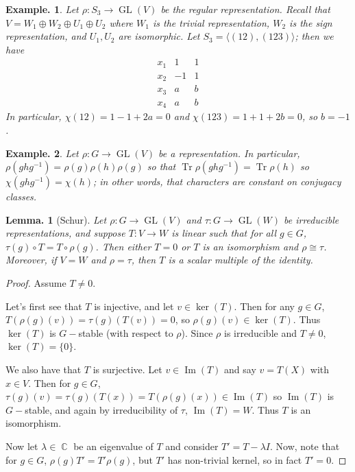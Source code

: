\documentclass[11pt, a4paper]{memoir}
\DeclareMathOperator{\C}{{\mathbb{C}}}
\theoremstyle{change}
\newtheorem{lemma}[theorem]{Lemma.}
\theoremstyle{plain}
\theoremstyle{nonumberplain}
\newtheorem{example}{Example.}
\newtheorem{proof}{Proof}
\DeclareMathOperator{\GL}{GL}
\renewcommand{\Im}{\ensuremath{\operatorname{Im}}}
\DeclareMathOperator{\Tr}{Tr}
\numberwithin{equation}{section}
\begin{document}
\begin{example}
    Let $\rho:S_3\to\GL(V)$ be the regular representation.
    Recall that $V=W_1\oplus W_2\oplus U_1\oplus U_2$ where $W_1$ is the trivial representation, $W_2$ is the sign representation, and $U_1,U_2$ are isomorphic.
    Let $S_3=\langle (12),(123)\rangle$; then we have
    \begin{equation*}
        \begin{array}{c|cc}
            x_1 & 1 & 1\\
            \hline
            x_2 & -1 & 1\\
            x_3 & a & b\\
            x_4 & a & b
        \end{array}
    \end{equation*}
    In particular, $\chi(12)=1-1+2a=0$ and $\chi(123)=1+1+2b=0$, so $b=-1$.
\end{example}
\begin{example}
    Let $\rho:G\to\GL(V)$ be a representation.
    In particular, $\rho(ghg^{-1})=\rho(g)\rho(h)\rho(g)$ so that $\Tr\rho(ghg^{-1})=\Tr\rho(h)$ so $\chi(ghg^{-1})=\chi(h)$; in other words, that characters are constant on conjugacy classes.
\end{example}
\begin{lemma}[Schur]
    Let $\rho:G\to\GL(V)$ and $\tau:G\to\GL(W)$ be irreducible representations, and suppose $T:V\to W$ is linear such that for all $g\in G$, $\tau(g)\circ T=T\circ\rho(g)$.
    Then either $T=0$ or $T$ is an isomorphism and $\rho\cong\tau$.
    Moreover, if $V=W$ and $\rho=\tau$, then $T$ is a scalar multiple of the identity.
\end{lemma}
\begin{proof}
    Assume $T\neq 0$.

    Let's first see that $T$ is injective, and let $v\in\ker(T)$.
    Then for any $g\in G$, $T(\rho(g)(v))=\tau(g)(T(v))=0$, so $\rho(g)(v)\in\ker(T)$.
    Thus $\ker(T)$ is $G-$stable (with respect to $\rho$).
    Since $\rho$ is irreducible and $T\neq 0$, $\ker(T)=\{0\}$.

    We also have that $T$ is surjective.
    Let $v\in\Im(T)$ and say $v=T(X)$ with $x\in V$.
    Then for $g\in G$, $\tau(g)(v)=\tau(g)(T(x))=T(\rho(g)(x))\in\Im(T)$ so $\Im(T)$ is $G-$stable, and again by irreducibility of $\tau$, $\Im(T)=W$.
    Thus $T$ is an isomorphism.

    Now let $\lambda\in\C$ be an eigenvalue of $T$ and consider $T'=T-\lambda I$.
    Now, note that for $g\in G$, $\rho(g)T'=T'\rho(g)$, but $T'$ has non-trivial kernel, so in fact $T'=0$.
\end{proof}
\end{document}
